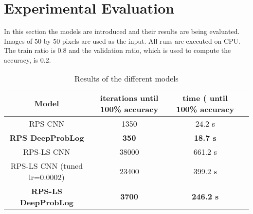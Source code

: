 \section{Experimental Evaluation}
In this section the models are introduced and their results are being evaluated. Images of 50 by 50 pixels are used as the input. All runs are executed on CPU. The train ratio is 0.8 and the validation ratio, which is used to compute the accuracy, is 0.2.







\begin{table}[!h]
    \centering
    \begin{tabular}{|c|c|c|c|}
        \hline
        Model & iterations until 100\% accuracy  & time ( until 100\% accuracy    \\
        \hline\hline
        RPS CNN & 1350 & 24.2 s \\
        \hline
        \textbf{RPS DeepProbLog} & \textbf{350} & \textbf{18.7 s} \\
        \hline
        \hline
        RPS-LS CNN & 38000 & 661.2 s\\
        \hline
        RPS-LS CNN (tuned lr=0.0002)& 23400 & 399.2 s\\
        \hline
        \textbf{RPS-LS DeepProbLog} & \textbf{3700} & \textbf{246.2 s}\\
        \hline
    \end{tabular}
    \caption{Results of the different models}
    \label{t1}
    \end{table}